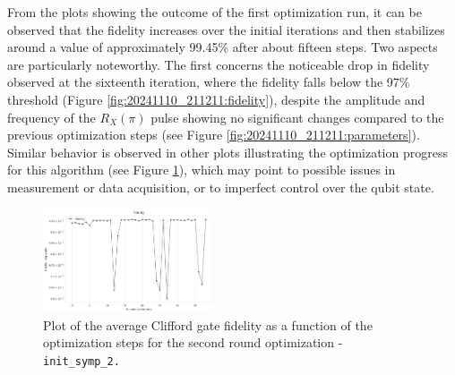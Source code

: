 From the plots showing the outcome of the first optimization run, it can be observed that the fidelity increases over the initial iterations and then stabilizes around a value of approximately 99.45\% after about fifteen steps.
Two aspects are particularly noteworthy. The first concerns the noticeable drop in fidelity observed at the sixteenth iteration, where the fidelity falls below the 97\% threshold (Figure \ref{fig:20241110_211211:fidelity}), despite the amplitude and frequency of the $R_X(\pi)$ pulse showing no significant changes compared to the previous optimization steps (see Figure \ref{fig:20241110_211211:parameters}).
Similar behavior is observed in other plots illustrating the optimization progress for this algorithm (see Figure \ref{fig:20241113_181711:fidelity}), which may point to possible issues in measurement or data acquisition, or to imperfect control over the qubit state.

\begin{figure}[h!]
    \centering
    \includegraphics[width=0.45\textwidth]{figures/png/RB_optimization/NM/InitialSymplex/20241113_181711/fidelity.png}
    \caption{Plot of the average Clifford gate fidelity as a function of the optimization steps for the second round optimization - \tt{init\_symp\_2}.}
    \label{fig:20241113_181711:fidelity}
\end{figure}

